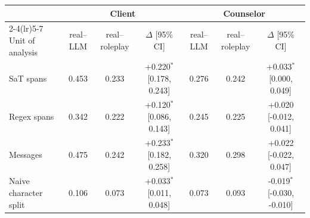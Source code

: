 \begin{tabular}{lcccccc}
\toprule
 & \multicolumn{3}{c}{Client} & \multicolumn{3}{c}{Counselor} \\
\cmidrule(lr){2-4}\cmidrule(lr){5-7}
Unit of analysis & real--LLM & real--roleplay & $\Delta$ [95\% CI] & real--LLM & real--roleplay & $\Delta$ [95\% CI] \\
\midrule
SaT spans & 0.453 & 0.233 & +0.220$^{*}$ [0.178, 0.243] & 0.276 & 0.242 & +0.033$^{*}$ [0.000, 0.049] \\
Regex spans & 0.342 & 0.222 & +0.120$^{*}$ [0.086, 0.143] & 0.245 & 0.225 & +0.020 [-0.012, 0.041] \\
Messages & 0.475 & 0.242 & +0.233$^{*}$ [0.182, 0.258] & 0.320 & 0.298 & +0.022 [-0.022, 0.047] \\
\midrule
Naive character split & 0.106 & 0.073 & +0.033$^{*}$ [0.011, 0.048] & 0.073 & 0.093 & -0.019$^{*}$ [-0.030, -0.010] \\
\bottomrule
\end{tabular}
